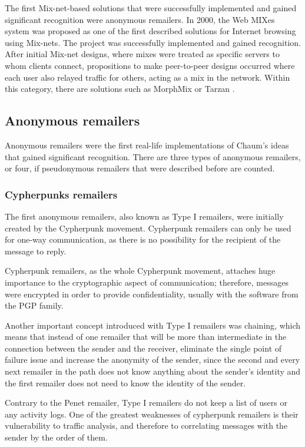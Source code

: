 The first Mix-net-based solutions that were successfully implemented and gained significant recognition were anonymous remailers.
In 2000, the Web MIXes system \cite{web-mixes} was proposed as one of the first described solutions for Internet browsing using Mix-nets. The project was successfully implemented and gained recognition.
After initial Mix-net designs, where mixes were treated as specific servers to whom clients connect, propositions to make peer-to-peer designs occurred where each user also relayed traffic for others, acting as a mix in the network. Within this category, there are solutions such as MorphMix \cite{morphmix} or Tarzan \cite{tarzan}.

\subsection{Anonymous remailers}
Anonymous remailers were the first real-life implementations of Chaum's ideas that gained significant recognition. There are three types of anonymous remailers, or four, if pseudonymous remailers that were described before are counted.

\subsubsection{Cypherpunks remailers}
The first anonymous remailers, also known as Type I remailers, were initially created by the Cypherpunk movement. Cypherpunk remailers can only be used for one-way communication, as there is no possibility for the recipient of the message to reply. 

Cypherpunk remailers, as the whole Cypherpunk movement, attaches huge importance to the cryptographic aspect of communication; therefore, messages were encrypted in order to provide confidentiality, usually with the software from the PGP family.

Another important concept introduced with Type I remailers was chaining, which means that instead of one remailer that will be more than intermediate in the connection between the sender and the receiver, eliminate the single point of failure issue and increase the anonymity of the sender, since the second and every next remailer in the path does not know anything about the sender’s identity and the first remailer does not need to know the identity of the sender.

Contrary to the Penet remailer, Type I remailers do not keep a list of users or any activity logs.
One of the greatest weaknesses of cypherpunk remailers is their vulnerability to traffic analysis, and therefore to correlating messages with the sender by the order of them.

